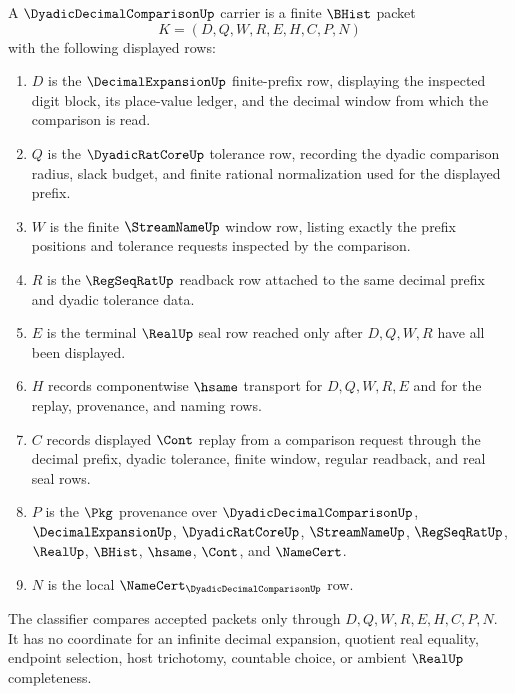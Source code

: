 \begin{definition}
\label{def:dyadic-decimal-comparison-carrier}
A $\DyadicDecimalComparisonUp$ carrier is a finite $\BHist$ packet
$$
K=(D,Q,W,R,E,H,C,P,N)
$$
with the following displayed rows:
\begin{enumerate}
\item $D$ is the $\DecimalExpansionUp$ finite-prefix row, displaying the inspected digit block, its place-value ledger, and the decimal window from which the comparison is read.
\item $Q$ is the $\DyadicRatCoreUp$ tolerance row, recording the dyadic comparison radius, slack budget, and finite rational normalization used for the displayed prefix.
\item $W$ is the finite $\StreamNameUp$ window row, listing exactly the prefix positions and tolerance requests inspected by the comparison.
\item $R$ is the $\RegSeqRatUp$ readback row attached to the same decimal prefix and dyadic tolerance data.
\item $E$ is the terminal $\RealUp$ seal row reached only after $D,Q,W,R$ have all been displayed.
\item $H$ records componentwise $\hsame$ transport for $D,Q,W,R,E$ and for the replay, provenance, and naming rows.
\item $C$ records displayed $\Cont$ replay from a comparison request through the decimal prefix, dyadic tolerance, finite window, regular readback, and real seal rows.
\item $P$ is the $\Pkg$ provenance over $\DyadicDecimalComparisonUp$, $\DecimalExpansionUp$, $\DyadicRatCoreUp$, $\StreamNameUp$, $\RegSeqRatUp$, $\RealUp$, $\BHist$, $\hsame$, $\Cont$, and $\NameCert$.
\item $N$ is the local $\NameCert_{\DyadicDecimalComparisonUp}$ row.
\end{enumerate}
The classifier compares accepted packets only through $D,Q,W,R,E,H,C,P,N$. It has no coordinate for an infinite decimal expansion, quotient real equality, endpoint selection, host trichotomy, countable choice, or ambient $\RealUp$ completeness.
\end{definition}

